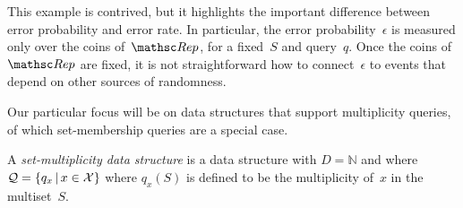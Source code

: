 This example is contrived, but it highlights the important
difference between error probability and error rate.  In particular,
the error probability~$\epsilon$ is measured only over the coins
of~$\Rep$, for a fixed~$S$ and query~$q$. Once the coins of~$\Rep$
are fixed, it is not straightforward how to connect~$\epsilon$ to
events that depend on other sources of randomness. 


 Our particular focus
will be on data structures that support multiplicity queries, of
which set-membership queries are a special case.
\begin{definition} A \emph{set-multiplicity data structure} is a data
structure with $D=\mathbb{N}$  and
where ${\cal Q}=\{q_x \,|\, x \in {\cal X}\}$ where $q_x(S)$ is defined to
be the multiplicity of~$x$ in the multiset~$S$. \hfill\dqed
\end{definition}
%


